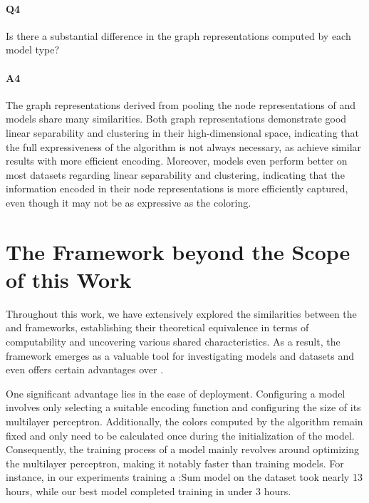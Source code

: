 \paragraph{Q4} Is there a substantial difference in the graph representations computed by each model type?

\vspace{-15pt}

\paragraph{A4} The graph representations derived from pooling the node representations of \wlnn and \gnn models share many similarities. Both graph representations demonstrate good linear separability and clustering in their high-dimensional space, indicating that the full expressiveness of the \wl algorithm is not always necessary, as \gnns achieve similar results with more efficient encoding. Moreover, \gnn models even perform better on most datasets regarding linear separability and clustering, indicating that the information encoded in their node representations is more efficiently captured, even though it may not be as expressive as the \wl coloring.\bigskip


\section{The \wlnn Framework beyond the Scope of this Work}
Throughout this work, we have extensively explored the similarities between the \wlnn and \gnn frameworks, establishing their theoretical equivalence in terms of computability and uncovering various shared characteristics. As a result, the \wlnn framework emerges as a valuable tool for investigating \gnn models and datasets and even offers certain advantages over \gnns.

One significant advantage lies in the ease of deployment. Configuring a \wlnn model involves only selecting a suitable encoding function and configuring the size of its multilayer perceptron. Additionally, the colors computed by the \wl algorithm remain fixed and only need to be calculated once during the initialization of the model. Consequently, the training process of a \wlnn model mainly revolves around optimizing the multilayer perceptron, making it notably faster than training \gnn models. For instance, in our experiments training a \gin:\textsf{Sum} model on the \zinc dataset took nearly 13 hours, while our best \wlnn model completed training in under 3 hours.

